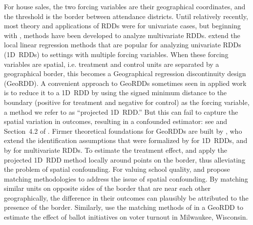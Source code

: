 For house sales, the two forcing variables are their geographical coordinates, and the threshold is the border between attendance districts.
Until relatively recently, most theory and applications of RDDs were for univariate cases,
but beginning with \citet{papay2011extending}, methods have been developed to analyze multivariate RDDs.
\citet{imbens2011regression} extend the local linear regression methods \citep[see][]{imbensrdd} that are popular for analyzing univariate RDDs (1D~RDDs) to settings with multiple forcing variables.
When these forcing variables are spatial, i.e. treatment and control units are separated by a geographical border, this becomes a Geographical regression discontinuity design (GeoRDD).
A convenient approach to GeoRDDs sometimes seen in applied work \citep[e.g.][]{macdonald2015effect,chen2013evidence,magruder2012high,holmes1998effect} is to 
reduce it to a 1D~RDD by using the signed minimum distance to the boundary (positive for treatment and negative for control) as the forcing variable, a method we refer to as ``projected 1D~RDD.''
But this can fail to capture the spatial variation in outcomes, resulting in a confounded estimator:
see \ofsupp{} and
Section~4.2 of \citet{keele_titiunik_2015}.
Firmer theoretical foundations for GeoRDDs are built by \citet{keele_titiunik_2015},
who extend the identification assumptions that were formalized by \citet{hahn2001identification} for 1D~RDDs, and by \citet{imbens2011regression} for multivariate RDDs.
To estimate the treatment effect, \citet{keele_titiunik_2015} and \citet{keeleoverview} apply the projected 1D~RDD method locally around points on the border, thus alleviating the problem of spatial confounding.
For valuing school quality, \citet{gibbons2013valuing} and \citet{fack2010better} propose matching methodologies to address the issue of spatial confounding.
By matching similar units on opposite sides of the border that are near each other geographically, the difference in their outcomes can plausibly be attributed to the presence of the border.
Similarly, \citet{keele2015enhancing} use the matching methods of \citet{zubizarreta2012using} in a GeoRDD to estimate the effect of ballot initiatives on voter turnout in Milwaukee, Wisconsin.

